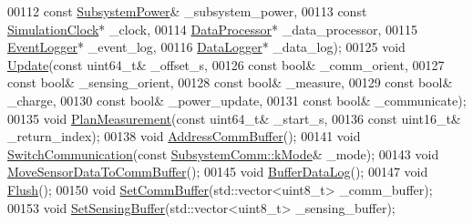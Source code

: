\begin{DoxyCode}
00112        \textcolor{keyword}{const} \hyperlink{classosse_1_1collaborate_1_1_subsystem_power}{SubsystemPower}& \_subsystem\_power,
00113        \textcolor{keyword}{const} \hyperlink{classosse_1_1collaborate_1_1_simulation_clock}{SimulationClock}* \_clock,
00114        \hyperlink{classosse_1_1collaborate_1_1_data_processor}{DataProcessor}* \_data\_processor,
00115        \hyperlink{classosse_1_1collaborate_1_1_event_logger}{EventLogger}* \_event\_log,
00116        \hyperlink{classosse_1_1collaborate_1_1_data_logger}{DataLogger}* \_data\_log);
00125   \textcolor{keywordtype}{void} \hyperlink{classosse_1_1collaborate_1_1_node_acd3b3577f11a2e3a360c98f47cbfdc59}{Update}(\textcolor{keyword}{const} uint64\_t& \_offset\_s,
00126               \textcolor{keyword}{const} \textcolor{keywordtype}{bool}& \_comm\_orient,
00127               \textcolor{keyword}{const} \textcolor{keywordtype}{bool}& \_sensing\_orient,
00128               \textcolor{keyword}{const} \textcolor{keywordtype}{bool}& \_measure,
00129               \textcolor{keyword}{const} \textcolor{keywordtype}{bool}& \_charge,
00130               \textcolor{keyword}{const} \textcolor{keywordtype}{bool}& \_power\_update,
00131               \textcolor{keyword}{const} \textcolor{keywordtype}{bool}& \_communicate);
00135   \textcolor{keywordtype}{void} \hyperlink{classosse_1_1collaborate_1_1_node_a39b4ab16083780371f5e4fa4acb406dc}{PlanMeasurement}(\textcolor{keyword}{const} uint64\_t& \_start\_s,
00136                        \textcolor{keyword}{const} uint16\_t& \_return\_index);
00138   \textcolor{keywordtype}{void} \hyperlink{classosse_1_1collaborate_1_1_node_ae36a2e5d2d098d9708a9884a6210a7f3}{AddressCommBuffer}();
00141   \textcolor{keywordtype}{void} \hyperlink{classosse_1_1collaborate_1_1_node_a45e01ee665774552f165918a13009264}{SwitchCommunication}(\textcolor{keyword}{const} \hyperlink{classosse_1_1collaborate_1_1_subsystem_comm_a5e1ce4f232ca2aae0b99d1225e682190}{SubsystemComm::kMode}& \_mode);
00143   \textcolor{keywordtype}{void} \hyperlink{classosse_1_1collaborate_1_1_node_a09b3bb653fbbc822e032ddcb21391578}{MoveSensorDataToCommBuffer}();
00145   \textcolor{keywordtype}{void} \hyperlink{classosse_1_1collaborate_1_1_node_ae2d23d2421c57428f2526688dd45617e}{BufferDataLog}();
00147   \textcolor{keywordtype}{void} \hyperlink{classosse_1_1collaborate_1_1_node_a1b150ab656ccb5432591ae6b487ee4c7}{Flush}();
00150   \textcolor{keywordtype}{void} \hyperlink{classosse_1_1collaborate_1_1_node_a222b22c38f2d5c317de945d798a76955}{SetCommBuffer}(std::vector<uint8\_t> \_comm\_buffer);
00153   \textcolor{keywordtype}{void} \hyperlink{classosse_1_1collaborate_1_1_node_a3bba23d7547d2de96f064d1473628d38}{SetSensingBuffer}(std::vector<uint8\_t> \_sensing\_buffer);

\end{DoxyCode}
